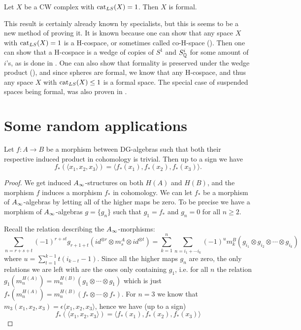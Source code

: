 \begin{corollary}
\label{cor:ls1_then_formal}
Let $X$ be a CW complex with $\text{cat}_{LS}(X)=1$. Then $X$ is formal.
\end{corollary}

This result is certainly already known by specialists, but this is seems to be a new method of proving it. It is known because one can show that any space $X$ with $\text{cat}_{LS}(X)=1$ is a H-cospace, or sometimes called co-H-space (\cite{hess}). Then one can show that a H-cospace is a wedge of copies of $S^1$ and $S_{\mathbb{Q}}^i$ for some amount of $i$'s, as is done in \cite[Theorem 3.]{co-H-space}. One can also show that formality is preserved under the wedge product (\cite{hess}), and since spheres are formal, we know that any H-cospace, and thus any space $X$ with $\text{cat}_{LS}(X)\leq 1$ is a formal space. The special case of suspended spaces being formal, was also proven in \cite[Proposition 13.9.]{FHT}. 



\iffalse

\section{Some random applications}

\begin{proposition}
Let $f\colon A\longrightarrow B$ be a morphism between DG-algebras such that both their respective induced product in cohomology is trivial. Then up to a sign we have
\begin{equation*}
    f_*(\langle x_1, x_2, x_3\rangle) = \langle f_*(x_1), f_*(x_2),  f_*(x_3)\rangle.
\end{equation*}
\end{proposition}
\begin{proof}
We get induced $A_{\infty}$-structures on both $H(A)$ and $H(B)$, and the morphism $f$ induces a morphism $f_*$ in cohomology. We can let $f_*$ be a morphism of $A_{\infty}$-algebras by letting all of the higher maps be zero. To be precise we have a morphism of $A_{\infty}$-algebras $g = \{g_n\}$ such that $g_1 = f_*$ and $g_n=0$ for all $n\geq 2$. 

Recall the relation describing the $A_{\infty}$-morphisms:
\begin{equation*}
    \sum_{n = r+s+t}(-1)^{r+st}g_{r+1+t}(id^{\otimes r}\otimes m_s^A \otimes id^{\otimes t}) = \sum_{k=1}^{n}\sum_{n=i_1+\cdots i_k}(-1)^{u} m_k^B(g_{i_1}\otimes g_{i_2}\otimes \cdots \otimes g_{i_k})
\end{equation*}
where $u=\displaystyle \sum_{t=1}^{k-1}t(i_{k-t}-1)$. Since all the higher maps $g_n$ are zero, the only relations we are left with are the ones only containing $g_1$, i.e. for all $n$ the relation $g_1(m_n^{H(A)}) = m_n^{H(B)}(g_1\otimes \cdots \otimes g_1)$ which is just $f_*(m_n^{H(A)}) = m_n^{H(B)}(f_*\otimes \cdots \otimes f_*)$. For $n=3$ we know that $m_3(x_1, x_2, x_3) = \epsilon \langle x_1, x_2, x_3\rangle$, hence we have (up to a sign)
\begin{equation*}
    f_*(\langle x_1, x_2, x_3\rangle) = \langle f_*(x_1), f_*(x_2),  f_*(x_3)\rangle
\end{equation*}
\end{proof}

